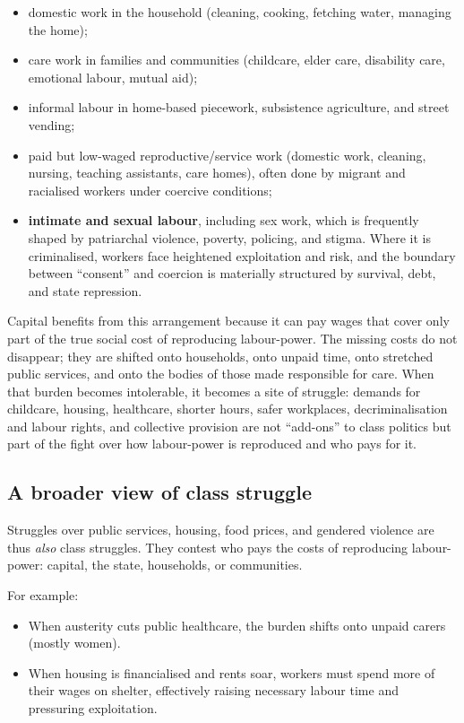 \begin{itemize}[leftmargin=1.5em]
  \item domestic work in the household (cleaning, cooking, fetching water, managing the home);
  \item care work in families and communities (childcare, elder care, disability care, emotional labour, mutual aid);
  \item informal labour in home-based piecework, subsistence agriculture, and street vending;
  \item paid but low-waged reproductive/service work (domestic work, cleaning, nursing, teaching assistants, care homes),
  often done by migrant and racialised workers under coercive conditions;
  \item \textbf{intimate and sexual labour}, including sex work, which is frequently shaped by patriarchal violence,
  poverty, policing, and stigma. Where it is criminalised, workers face heightened exploitation and risk, and the
  boundary between ``consent'' and coercion is materially structured by survival, debt, and state repression.
\end{itemize}

Capital benefits from this arrangement because it can pay wages that cover only part of the true social cost of reproducing labour-power. The missing costs do not disappear;
they are shifted onto households, onto unpaid time, onto stretched public services, and onto the bodies of those made responsible for care. When that burden becomes intolerable,
it becomes a site of struggle: demands for childcare, housing, healthcare, shorter hours, safer workplaces, decriminalisation and labour rights, and collective provision are not
``add-ons'' to class politics but part of the fight over how labour-power is reproduced and who pays for it.


\subsection{A broader view of class struggle}

Struggles over public services, housing, food prices, and gendered violence
are thus \emph{also} class struggles. They contest who pays the costs of
reproducing labour-power: capital, the state, households, or communities.

For example:

\begin{itemize}[leftmargin=1.5em]
  \item When austerity cuts public healthcare, the burden shifts onto unpaid
  carers (mostly women).
  \item When housing is financialised and rents soar, workers must spend more
  of their wages on shelter, effectively raising necessary labour time and
  pressuring exploitation.
\end{itemize}


